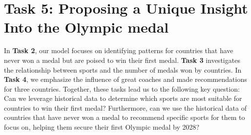 \documentclass[12pt]{article}  %
\begin{document}
\section{Task 5: Proposing a Unique Insight Into the Olympic medal}
In \textbf{Task 2}, our model focuses on identifying patterns for countries that have never won a medal but are poised to win their first medal. \textbf{Task 3} investigates the relationship between sports and the number of medals won by countries. In \textbf{Task 4}, we emphasize the influence of great coaches and made recommendations for three countries. Together, these tasks lead us to the following key question: Can we leverage historical data to determine which sports are most suitable for countries to win their first medal? Furthermore, can we use the historical data of countries that have never won a medal to recommend specific sports for them to focus on, helping them secure their first Olympic medal by 2028?
\end{document}
